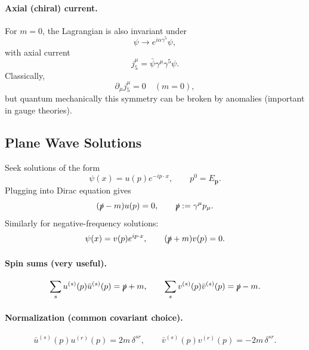\paragraph{Axial (chiral) current.}
For $m=0$, the Lagrangian is also invariant under
\begin{equation}
\psi \to e^{i\alpha\gamma^5}\psi,
\end{equation}
with axial current
\begin{equation}
j_5^\mu=\bar{\psi}\gamma^\mu\gamma^5\psi.
\end{equation}
Classically,
\begin{equation}
\partial_\mu j_5^\mu = 0 \quad (m=0),
\end{equation}
but quantum mechanically this symmetry can be broken by anomalies (important in gauge theories).

\subsection{Plane Wave Solutions}
Seek solutions of the form
\begin{equation}
\psi(x)=u(p)e^{-ip\cdot x},
\qquad p^0=E_{\mathbf{p}}.
\end{equation}
Plugging into Dirac equation gives
\begin{equation}
(\slashed{p}-m)u(p)=0,
\qquad
\slashed{p}:=\gamma^\mu p_\mu.
\end{equation}
Similarly for negative-frequency solutions:
\begin{equation}
\psi(x)=v(p)e^{ip\cdot x},
\qquad
(\slashed{p}+m)v(p)=0.
\end{equation}

\paragraph{Spin sums (very useful).}
\begin{equation}
\sum_s u^{(s)}(p)\bar{u}^{(s)}(p)=\slashed{p}+m,
\qquad
\sum_s v^{(s)}(p)\bar{v}^{(s)}(p)=\slashed{p}-m.
\end{equation}

\paragraph{Normalization (common covariant choice).}
\begin{equation}
\bar{u}^{(s)}(p)u^{(r)}(p)=2m\,\delta^{sr},
\qquad
\bar{v}^{(s)}(p)v^{(r)}(p)=-2m\,\delta^{sr}.
\end{equation}

